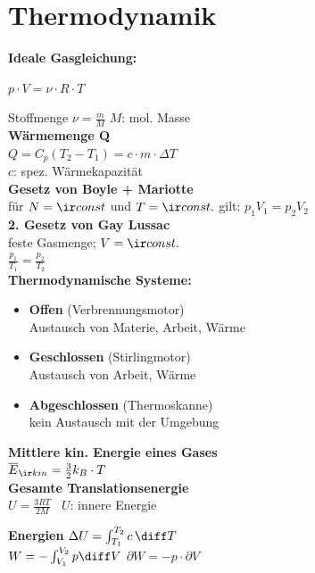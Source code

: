 \documentclass[german]{latex4ei/latex4ei_sheet}
\begin{document}
\section{Thermodynamik}
\begin{sectionbox}
\textbf{Ideale Gasgleichung:} 
\begin{emphbox}
$p \cdot V = \nu \cdot R \cdot T$ 
\end{emphbox}
Stoffmenge $\nu = \frac{m}{M}$ \qquad $M$: mol. Masse\\
\textbf{Wärmemenge Q} \\
$Q=C_p(T_2-T_1)=c \cdot m \cdot \Delta T$ \\ $c$: spez. Wärmekapazität \\

\textbf{Gesetz von Boyle + Mariotte} \\
für $N=\ir const$ und $T=\ir const.$ gilt: $p_1V_1=p_2V_2$ \\

\textbf{2. Gesetz von Gay Lussac} \\
feste Gasmenge; $V=\ir const.$\\
$\frac{p_1}{T_1}=\frac{p_2}{T_2}$ \\

\textbf{Thermodynamische Systeme:}
\begin{itemize}
	\item \textbf{Offen} (Verbrennungsmotor) \\
		Austausch von Materie, Arbeit, Wärme
	\item \textbf{Geschlossen} (Stirlingmotor) \\
		Austausch von Arbeit, Wärme
	\item \textbf{Abgeschlossen} (Thermoskanne) \\
		kein Austausch mit der Umgebung
		
\end{itemize}

\textbf{Mittlere kin. Energie eines Gases} \\
$\overline{E}_{\ir kin}=\frac{3}{2}k_B \cdot T$ \\

\textbf{Gesamte Translationsenergie} \\
$U=\frac{3RT}{2M}$ \, $U$: innere Energie

\textbf{Energien}
$\Delta U = \int_{T_1}^{T_2} c \, \diff T$\\
$W=-\int_{V_1}^{V_2} p \diff V$ \qquad $\partial W= -p \cdot \partial V$

\end{sectionbox}
\end{document}
